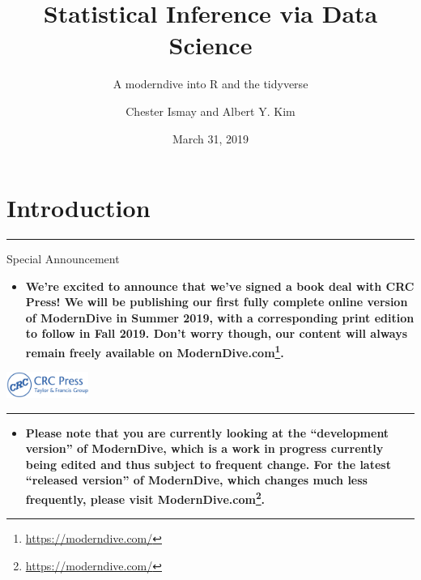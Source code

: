\documentclass[12pt, krantz2,]{krantz}
\title{Statistical Inference via Data Science}
\subtitle{A moderndive into R and the tidyverse}
\author{Chester Ismay and Albert Y. Kim}
\date{March 31, 2019}
\renewcommand{\href}[2]{#2\footnote{\url{#1}}}
\newenvironment{rmdblock}[1]
  {\begin{shaded*}
  \begin{itemize}
  \renewcommand{\labelitemi}{
    \raisebox{-.7\height}[0pt][0pt]{
    }
  }
  \item
  }
  {
  \end{itemize}
  \end{shaded*}
  }
\newenvironment{learncheck}
  {\begin{rmdblock}{warning}}
  {\end{rmdblock}}
\newenvironment{announcement}
  {\begin{rmdblock}{warning}}
  {\end{rmdblock}}
\begin{document}
\maketitle


\thispagestyle{empty}

\begin{center}
\end{center}

\setlength{\abovedisplayskip}{-5pt}
\setlength{\abovedisplayshortskip}{-5pt}

{
\hypersetup{linkcolor=}
\setcounter{tocdepth}{2}
\tableofcontents
}
\listoftables
\listoffigures
\mainmatter

\hypertarget{intro}{%
\chapter{Introduction}\label{intro}}

\begin{center}\rule{0.5\linewidth}{\linethickness}\end{center}

Special Announcement

\begin{announcement}
\textbf{We're excited to announce that we've signed a book deal with CRC
Press! We will be publishing our first fully complete online version of
ModernDive in Summer 2019, with a corresponding print edition to follow
in Fall 2019. Don't worry though, our content will always remain freely
available on \href{https://moderndive.com/}{ModernDive.com}.}
\end{announcement}

\includegraphics[width=0.2\textwidth,height=\textheight]{images/crc_press.jpg}

\begin{center}\rule{0.5\linewidth}{\linethickness}\end{center}

\begin{learncheck}
\textbf{Please note that you are currently looking at the ``development
version'' of ModernDive, which is a work in progress currently being
edited and thus subject to frequent change. For the latest ``released
version'' of ModernDive, which changes much less frequently, please
visit \href{https://moderndive.com/}{ModernDive.com}.}
\end{learncheck}
\end{document}
